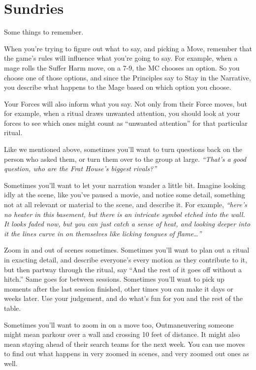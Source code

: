 \documentclass[
  oneside,
  statementpaper,
  9pt]{memoir}
\begin{document}
\hypertarget{sundries}{%
\section{Sundries}\label{sundries}}

Some things to remember.

When you're trying to figure out what to say, and picking a Move,
remember that the game's rules will influence what you're going to say.
For example, when a mage rolls the Suffer Harm move, on a 7-9, the MC
chooses an option. So you choose one of those options, and since the
Principles say to Stay in the Narrative, you describe what happens to
the Mage based on which option you choose.

Your Forces will also inform what you say. Not only from their Force
moves, but for example, when a ritual draws unwanted attention, you
should look at your forces to see which ones might count as ``unwanted
attention'' for that particular ritual.

Like we mentioned above, sometimes you'll want to turn questions back on
the person who asked them, or turn them over to the group at large.
\emph{``That's a good question, who are the Frat House's biggest
rivals?''}

Sometimes you'll want to let your narration wander a little bit. Imagine
looking idly at the scene, like you've paused a movie, and notice some
detail, something not at all relevant or material to the scene, and
describe it. For example, \emph{``here's no heater in this basement, but
there is an intricate symbol etched into the wall. It looks faded now,
but you can just catch a sense of heat, and looking deeper into it the
lines curve in on themselves like licking tongues of flame\ldots{}''}

Zoom in and out of scenes sometimes. Sometimes you'll want to plan out a
ritual in exacting detail, and describe everyone's every motion as they
contribute to it, but then partway through the ritual, say ``And the
rest of it goes off without a hitch.'' Same goes for between sessions.
Sometimes you'll want to pick up moments after the last session
finished, other times you can make it days or weeks later. Use your
judgement, and do what's fun for you and the rest of the table.

Sometimes you'll want to zoom in on a move too, Outmaneuvering someone
might mean parkour over a wall and crossing 10 feet of distance. It
might also mean staying ahead of their search teams for the next week.
You can use moves to find out what happens in very zoomed in scenes, and
very zoomed out ones as well.
\end{document}
